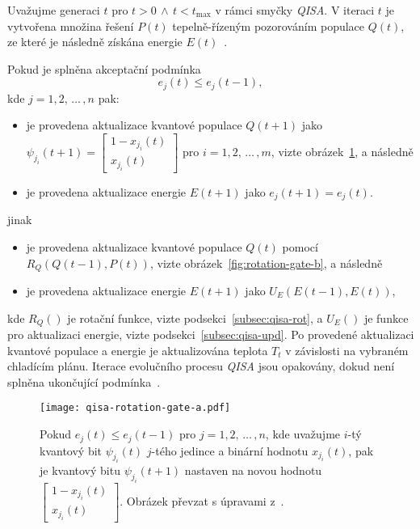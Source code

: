 Uvažujme generaci $t$ pro $t>0\,\wedge\,t < t_{\text{max}}$ v rámci smyčky \emph{QISA}. 
V iteraci $t$ je vytvořena množina řešení $P\left(t\right)$ tepelně-řízeným pozorováním populace $Q\left(t\right)$, ze které je následně získána energie $E\left(t\right)$~\cite{qisa}.

Pokud je splněna akceptační podmínka
\begin{equation}\label{eq:qisa-if}
    e_j\left(t\right) \leq e_j\left(t-1\right),
\end{equation}
kde $j = 1,2,\,\dots\,,n$ pak:
\begin{itemize}
    \item je provedena aktualizace kvantové populace $Q\left(t+1\right)$ jako $\psi_{j_i}\left(t+1\right) = \begin{bmatrix} 1 - x_{j_i}\left(t\right) \\ x_{j_i}\left(t\right) \end{bmatrix}$ pro $i=1,2,\,\dots\,,m$, vizte obrázek~\ref{fig:rotation-gate-a}, a následně
    \item je provedena aktualizace energie $E\left(t+1\right)$ jako $e_j\left(t+1\right) = e_j\left(t\right)$.
\end{itemize}
jinak
\begin{itemize}
    \item je provedena aktualizace kvantové populace $Q\left(t\right)$ pomocí $R_Q\left(Q\left(t-1\right), P\left(t\right) \right)$, vizte obrázek~\ref{fig:rotation-gate-b}, a následně
    \item je provedena aktualizace energie $E\left(t+1\right)$ jako $U_E\left(E\left(t-1\right), E\left(t\right)\right)$,
\end{itemize}
kde $R_Q\left(\right)$ je rotační funkce, vizte podsekci~\ref{subsec:qisa-rot}, a $U_E\left(\right)$ je funkce pro aktualizaci energie, vizte podsekci~\ref{subsec:qisa-upd}.
Po provedené aktualizaci kvantové populace a energie je aktualizována teplota $T_t$ v závislosti na vybraném chladícím plánu. 
Iterace evolučního procesu \emph{QISA} jsou opakovány, dokud není splněna ukončující podmínka~\cite{qisa}.
\begin{figure}[ht!]
    \centering
    \texttt{[image: qisa-rotation-gate-a.pdf]}
    \caption{Pokud $e_j\left(t\right) \leq e_j\left(t-1\right)$ pro $j = 1,2,\,\dots\,,n$, kde uvažujme $i$-tý kvantový bit $\psi_{j_i}\left(t\right)$ $j$-tého jedince a binární hodnotu $x_{j_i} \left(t\right)$, pak je kvantový bitu $\psi_{j_i}\left(t+1\right)$ nastaven na novou hodnotu $\begin{bmatrix} 1 - x_{j_i}\left(t\right) \\ x_{j_i}\left(t\right) \end{bmatrix}$. Obrázek převzat s úpravami z~\cite{qisa}.}
    \label{fig:rotation-gate-a}
\end{figure}

